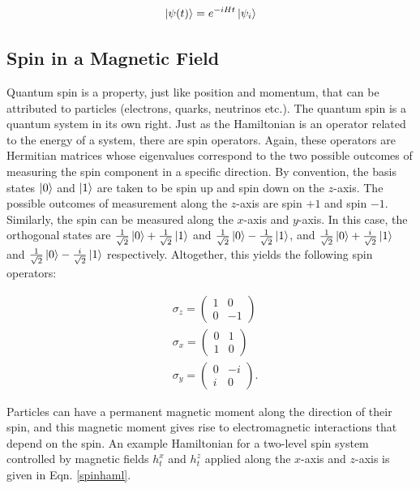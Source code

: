 \documentclass[{../RL_for_QSP.tex}]{subfiles}
\begin{document}
\begin{equation}\label{shrsol}
    \ket{\psi(t)} = e^{-iH t}\ket{\psi_i}
\end{equation}

\subsection{Spin in a Magnetic Field}
Quantum spin is a property, just like position and momentum, that can be attributed to particles (electrons, quarks, neutrinos etc.). The quantum spin is a quantum system in its own right. Just as the Hamiltonian is an operator related to the energy of a system, there are spin operators. Again, these operators are Hermitian matrices whose eigenvalues correspond to the two possible outcomes of measuring the spin component in a specific direction. By convention, the basis states $\ket{0}$ and $\ket{1}$ are taken to be spin up and spin down on the $z$-axis. The possible outcomes of measurement along the $z$-axis are spin $+1$ and spin $-1$. Similarly, the spin can be measured along the $x$-axis and $y$-axis. In this case, the orthogonal states are $\frac{1}{\sqrt{2}}\ket{0} + \frac{1}{\sqrt{2}}\ket{1}$ and $\frac{1}{\sqrt{2}}\ket{0} - \frac{1}{\sqrt{2}}\ket{1}$, and $\frac{1}{\sqrt{2}}\ket{0} + \frac{i}{\sqrt{2}}\ket{1}$ and $\frac{1}{\sqrt{2}}\ket{0} - \frac{i}{\sqrt{2}}\ket{1}$ respectively. Altogether, this yields the following spin operators:

\begin{align*}
    &\sigma_z = \begin{pmatrix}
    1 & 0 \\
    0 & -1
    \end{pmatrix} \\
    &\sigma_x = \begin{pmatrix}
    0 & 1 \\
    1 & 0
    \end{pmatrix} \\
    &\sigma_y = \begin{pmatrix}
    0 & -i \\
    i & 0
    \end{pmatrix}.
\end{align*}

Particles can have a permanent magnetic moment along the direction of their spin, and this magnetic moment gives rise to electromagnetic interactions that depend on the spin. An example Hamiltonian for a two-level spin system controlled by magnetic fields $h_t^x$ and $h_t^z$ applied along the $x$-axis and $z$-axis is given in Eqn. \ref{spinhaml}.
\end{document}
